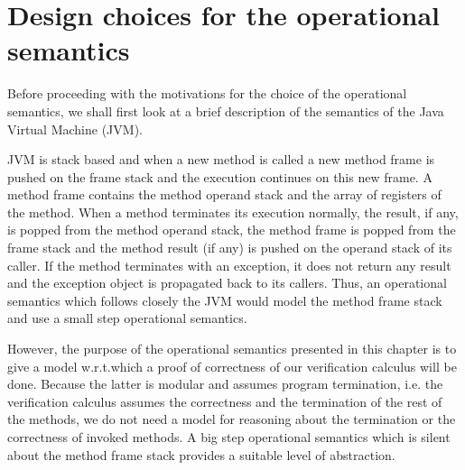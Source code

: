 
\section{Design choices for the operational semantics}\label{opSem:JVM}


 Before proceeding with the motivations for the choice of the operational semantics,
 we shall first look at a brief description of the semantics of the Java Virtual Machine (JVM).

 JVM is stack based and when a new method is called a new method frame is pushed on the frame stack and the execution continues on this new frame.
 A method frame contains the method operand stack and the array of registers of the method.
 When a method terminates its execution normally, the result, if any, is popped from the method operand stack, the method frame is
 popped from the frame stack and the method result (if any) is pushed on the operand stack
 of its caller. If the method terminates with an exception, it does not return any result and the exception object is propagated back to its callers.
 Thus, an operational semantics which  follows closely the JVM would model the method frame stack and use a small step operational semantics. 
 
 However, the purpose of the operational semantics presented in this chapter is to give
 a model w.r.t.which a proof of correctness of our verification calculus will be done. Because the latter
 is modular and assumes program termination,
 i.e. the verification calculus assumes the correctness and the termination of the rest of the methods,
 we do not need a model for reasoning about the termination or the correctness of invoked methods.
 A big step operational semantics which is silent about the method frame stack
 provides a suitable level of abstraction.
 

 

 

